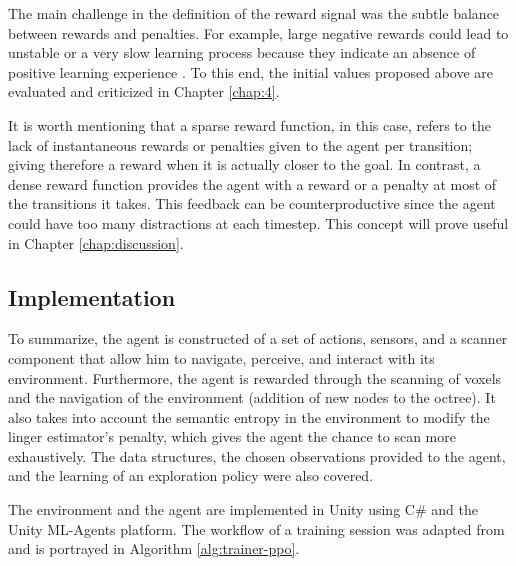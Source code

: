 The main challenge in the definition of the reward signal was the subtle balance between rewards and penalties. For example, large negative rewards could lead to unstable or a very slow learning process because they indicate an absence of positive learning experience \cite{sutton2018reinforcement}. To this end, the initial values proposed above are evaluated and criticized in Chapter \ref{chap:4}.

 It is worth mentioning that a sparse reward function, in this case, refers to the lack of instantaneous rewards or penalties given to the agent per transition; giving therefore a reward when it is actually closer to the goal. In contrast, a dense reward function provides the agent with a reward or a penalty at most of the transitions it takes. This feedback can be counterproductive since the agent could have too many distractions at each timestep. This concept will prove useful in Chapter \ref{chap:discussion}.



\subsection{Implementation}
To summarize, the agent is constructed of a set of actions, sensors, and a scanner component that allow him to navigate, perceive, and interact with its environment. Furthermore, the agent is rewarded through the scanning of voxels and the navigation of the environment (addition of new nodes to the octree). It also takes into account the semantic entropy in the environment to modify the linger estimator's penalty, which gives the agent the chance to scan more exhaustively. The data structures, the chosen observations provided to the agent, and the learning of an exploration policy were also covered. 

The environment and the agent are implemented in Unity using C\# and the Unity ML-Agents platform. 
The workflow of a training session was adapted from \cite{eriksson2021deep} and is portrayed in Algorithm \ref{alg:trainer-ppo}.

